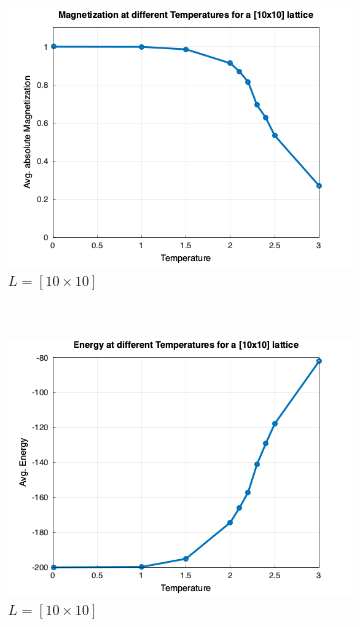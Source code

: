 \begin{figure}[t]
\begin{subfigure}{0.5\textwidth}
		\includegraphics[width=\textwidth]{./img/avg_mag_10.png}
		\caption{$L=[10\times10]$}
		\label{sfig:sublabel3}
	\end{subfigure}%
	~
	\begin{subfigure}{0.5\textwidth}
		\includegraphics[width=\textwidth]{./img/avg_en_10.png}
		\caption{$L=[10\times10]$}
		\label{sfig:sublabel4}
	\end{subfigure}\\
	\begin{subfigure}{0.5\textwidth}

\end{subfigure}
\end{figure}
